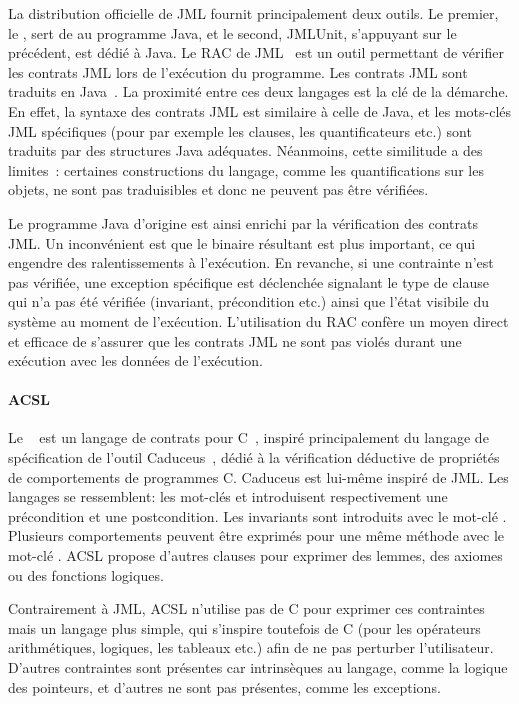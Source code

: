 La distribution officielle de JML fournit principalement deux outils.  Le
premier, le , sert de
 au programme Java, et le second, JMLUnit, s'appuyant sur
le précédent, est dédié à Java. Le RAC de JML~ est un outil
permettant de vérifier les contrats JML lors de l'exécution du programme. Les
contrats JML sont traduits en Java~. La proximité entre ces
deux langages est la clé de la démarche. En effet, la syntaxe des contrats JML
est similaire à celle de Java, et les mots-clés JML spécifiques (pour par
exemple les clauses, les quantificateurs etc.) sont traduits par des structures
Java adéquates. Néanmoins, cette similitude a des limites~: certaines
constructions du langage, comme les quantifications sur les objets, ne sont pas
traduisibles et donc ne peuvent pas être vérifiées.

Le programme Java d'origine est ainsi enrichi par la vérification des contrats
JML. Un inconvénient est que le binaire résultant est plus important, ce qui
engendre des ralentissements à l'exécution. En revanche, si une contrainte n'est
pas vérifiée, une exception spécifique est déclenchée signalant le type de
clause qui n'a pas été vérifiée (invariant, précondition etc.) ainsi que l'état
visibile du système au moment de l'exécution. L'utilisation du RAC confère un
moyen direct et efficace de s'assurer que les contrats JML ne sont pas violés
durant une exécution avec les données de l'exécution.

\paragraph{ACSL} Le ~ est
un langage de contrats pour C~, inspiré principalement du langage de
spécification de l'outil Caduceus~, dédié à la vérification
déductive de propriétés de comportements de programmes C. Caduceus est lui-même
inspiré de JML. Les langages se ressemblent: les mot-clés  et
 introduisent respectivement une précondition et une
postcondition. Les invariants sont introduits avec le mot-clé .
Plusieurs comportements peuvent être exprimés pour une même méthode avec le
mot-clé . ACSL propose d'autres clauses pour exprimer des
lemmes, des axiomes ou des fonctions logiques.

Contrairement à JML, ACSL n'utilise pas de C pour exprimer ces con\-train\-tes
mais un langage plus simple, qui s'inspire toutefois de C (pour les opérateurs
arithmétiques, logiques, les tableaux etc.) afin de ne pas perturber
l'utilisateur. D'autres contraintes sont présentes car intrinsèques au langage,
comme la logique des pointeurs, et d'autres ne sont pas présentes, comme les
exceptions.

